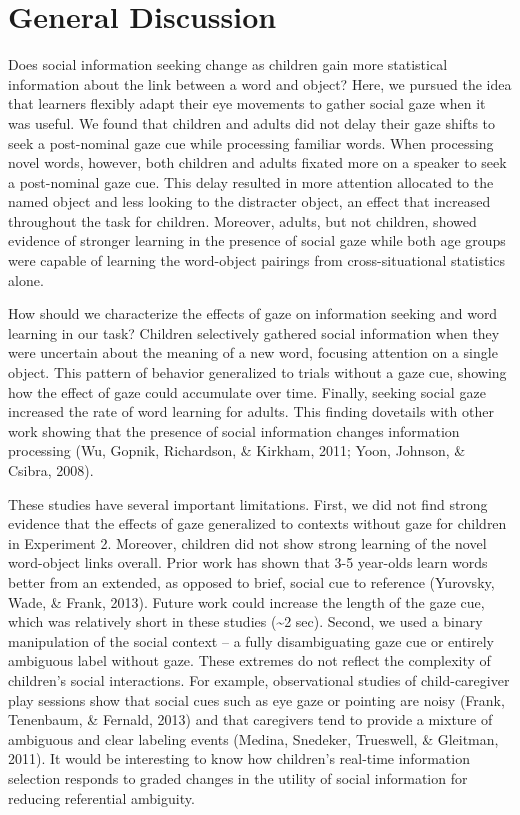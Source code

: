 \documentclass[10pt, letterpaper]{article}
\begin{document}
\hypertarget{general-discussion}{%
\section{General Discussion}\label{general-discussion}}

Does social information seeking change as children gain more statistical
information about the link between a word and object? Here, we pursued
the idea that learners flexibly adapt their eye movements to gather
social gaze when it was useful. We found that children and adults did
not delay their gaze shifts to seek a post-nominal gaze cue while
processing familiar words. When processing novel words, however, both
children and adults fixated more on a speaker to seek a post-nominal
gaze cue. This delay resulted in more attention allocated to the named
object and less looking to the distracter object, an effect that
increased throughout the task for children. Moreover, adults, but not
children, showed evidence of stronger learning in the presence of social
gaze while both age groups were capable of learning the word-object
pairings from cross-situational statistics alone.

How should we characterize the effects of gaze on information seeking
and word learning in our task? Children selectively gathered social
information when they were uncertain about the meaning of a new word,
focusing attention on a single object. This pattern of behavior
generalized to trials without a gaze cue, showing how the effect of gaze
could accumulate over time. Finally, seeking social gaze increased the
rate of word learning for adults. This finding dovetails with other work
showing that the presence of social information changes information
processing (Wu, Gopnik, Richardson, \& Kirkham, 2011; Yoon, Johnson, \&
Csibra, 2008).

These studies have several important limitations. First, we did not find
strong evidence that the effects of gaze generalized to contexts without
gaze for children in Experiment 2. Moreover, children did not show
strong learning of the novel word-object links overall. Prior work has
shown that 3-5 year-olds learn words better from an extended, as opposed
to brief, social cue to reference (Yurovsky, Wade, \& Frank, 2013).
Future work could increase the length of the gaze cue, which was
relatively short in these studies (\textasciitilde{}2 sec). Second, we
used a binary manipulation of the social context -- a fully
disambiguating gaze cue or entirely ambiguous label without gaze. These
extremes do not reflect the complexity of children's social
interactions. For example, observational studies of child-caregiver play
sessions show that social cues such as eye gaze or pointing are noisy
(Frank, Tenenbaum, \& Fernald, 2013) and that caregivers tend to provide
a mixture of ambiguous and clear labeling events (Medina, Snedeker,
Trueswell, \& Gleitman, 2011). It would be interesting to know how
children's real-time information selection responds to graded changes in
the utility of social information for reducing referential ambiguity.
\end{document}
